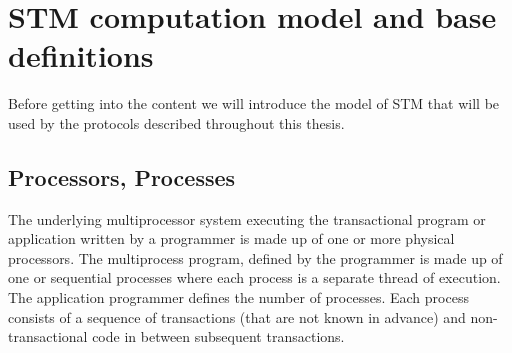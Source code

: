 















































\section{STM computation model and base definitions}
\label{sec:model-and-conditions}



Before getting into the content we will introduce the model of STM that will be used
by the protocols described throughout this thesis.

\subsection{Processors, Processes}
The underlying multiprocessor system executing the transactional program or application
written by a programmer is made up of one or more physical processors.
The multiprocess program, defined  by the  programmer is  made up  of one or
sequential processes  where each process is a separate thread of execution.
The application programmer defines the number of processes.
Each process consists of  a sequence of 
transactions (that are not known in advance) and non-transactional code
in between subsequent transactions.






